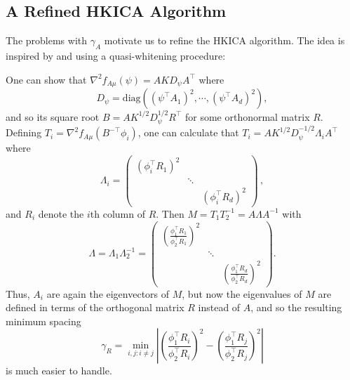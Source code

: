 \documentclass[11pt]{article}
\begin{document}
\subsection{A Refined HKICA Algorithm}
\label{subsec:DICA}
The problems with $\gamma_A$ motivate us to refine the HKICA algorithm.
The idea is inspired by \citet{arora2012provable} and \citet{frieze1996learning} using a quasi-whitening procedure:

One can show that $\nabla^2 f_{A\mu}(\psi)=A K D_{\psi} A^\top$ where 
$$D_{\psi} =\text{diag}\left((\psi^{\top}A_1)^2,\cdots, (\psi^{\top}A_d)^2\right),$$
and so its square root $B= AK^{1/2}D_{\psi}^{1/2}R^{\top}$ for some orthonormal matrix $R$. Defining $T_i=\nabla^2 f_{A\mu}(B^{-\top} \phi_i)$, one can calculate that
$T_i=A K^{1/2} D_\psi^{-1/2} \Lambda_i A^\top$ where 
\[
\Lambda_i =\left( 
\begin{array}{ccc}
(\phi_i^\top R_1)^2 & & \\
& \ddots  & \\
& & (\phi_i^\top R_d)^2 
\end{array}
\right)\,,
\] 
and $R_i$ denote the $i$th column of $R$.
Then $M=T_1 T_2^{-1} = A\Lambda A^{-1}$ with 
\[
\Lambda=\Lambda_1 \Lambda_2^{-1}=\left( 
\begin{array}{ccc}
\left(\frac{\phi_1^\top R_1}{\phi_2^\top R_1}\right)^2 & & \\
& \ddots & \\
& & \left(\frac{\phi_1^\top R_d}{\phi_2^\top R_d}\right)^2
\end{array}
\right).
\]
Thus, $A_i$ are again the eigenvectors of $M$, but now the eigenvalues of $M$ are defined in terms of the orthogonal matrix $R$ instead of $A$,
and so the resulting minimum spacing
\begin{equation}
\label{def:gammaR}
\gamma_R =  \min_{i,j: i\neq j} \left\vert \left(\frac{\phi_1^{\top}R_i}{\phi_2^{\top}R_i}\right)^2 - \left(\frac{\phi_1^{\top}R_j}{\phi_2^{\top}R_j}\right)^2 \right\vert
\end{equation}
is much easier to handle.
\end{document}
